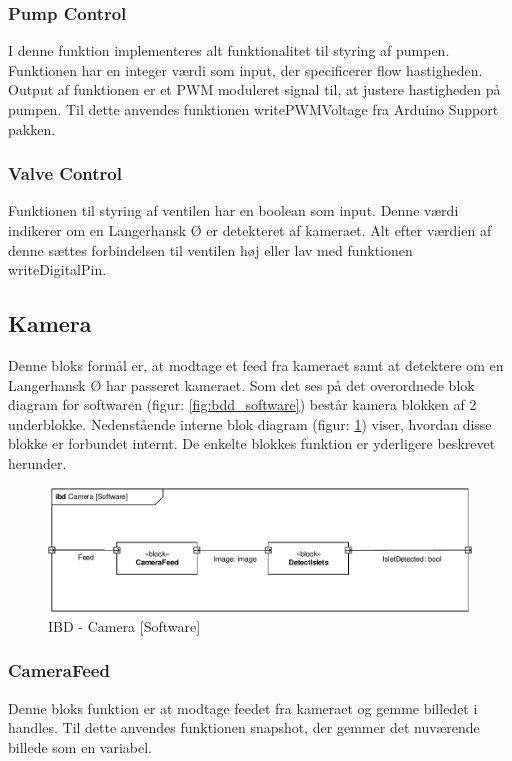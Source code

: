 \subsubsection{Pump Control}
I denne funktion implementeres alt funktionalitet til styring af pumpen. Funktionen har en integer værdi som input, der specificerer flow hastigheden. Output af funktionen er et PWM moduleret signal til, at justere hastigheden på pumpen. Til dette anvendes funktionen writePWMVoltage fra Arduino Support pakken.
\subsubsection{Valve Control}
Funktionen til styring af ventilen har en boolean som input. Denne værdi indikerer om en Langerhansk Ø er detekteret af kameraet. Alt efter værdien af denne sættes forbindelsen til ventilen høj eller lav med funktionen writeDigitalPin. 

\newpage
\subsection{Kamera}
Denne bloks formål er, at modtage et feed fra kameraet samt at detektere om en Langerhansk Ø har passeret kameraet. Som det ses på det overordnede blok diagram for softwaren (figur: \ref{fig:bdd_software}) består kamera blokken af 2 underblokke. Nedenstående interne blok diagram (figur: \ref{fig:ibd_software_camera}) viser, hvordan disse blokke er forbundet internt. De enkelte blokkes funktion er yderligere beskrevet herunder.
\begin{figure}[H]
	\centering
	\includegraphics[width=1\textwidth]{billeder/IBD_Software_Kamera-crop.pdf}
	\caption{IBD - Camera [Software]}
	\label{fig:ibd_software_camera}
\end{figure}

\subsubsection{CameraFeed}
Denne bloks funktion er at modtage feedet fra kameraet og gemme billedet i handles. Til dette anvendes funktionen snapshot, der gemmer det nuværende billede som en variabel.  
